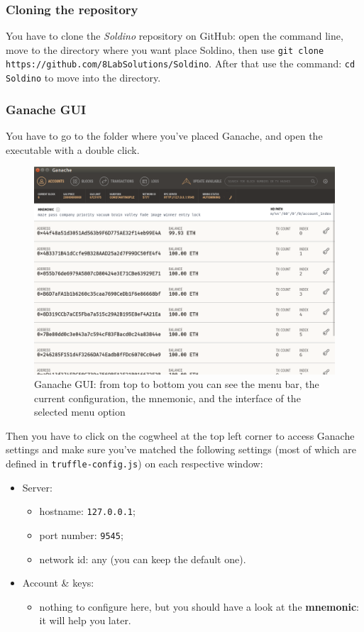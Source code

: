 \subsubsection{Cloning the repository}
You have to clone the \textit{Soldino} repository on GitHub: open the command line, move to the directory where you want place Soldino, then use \texttt{git clone https://github.com/8LabSolutions/Soldino}. After that use the command: \texttt{cd Soldino} to move into the directory.

\subsubsection{Ganache GUI}
You have to go to the folder where you've placed Ganache, and open the executable with a double click.
\begin{figure}
	\centering
	\includegraphics[scale=0.25]{res/images/ganache-ui.png}
	\caption{Ganache GUI: from top to bottom you can see the menu bar, the current configuration, the mnemonic, and the interface of the selected menu option}
\end{figure}
Then you have to click on the cogwheel at the top left corner to access Ganache settings and make sure you've matched the following settings (most of which are defined in \texttt{truffle-config.js}) on each respective window:
\begin{itemize}
	\item Server:
	\begin{itemize}
		\item hostname: \texttt{127.0.0.1};
		\item port number: \texttt{9545};
		\item network id: any (you can keep the default one).
	\end{itemize}
	\item Account \& keys\glo:
	\begin{itemize}
		\item nothing to configure here, but you should have a look at the \textbf{mnemonic}: it will help you later.
	\end{itemize}
\end{itemize}


